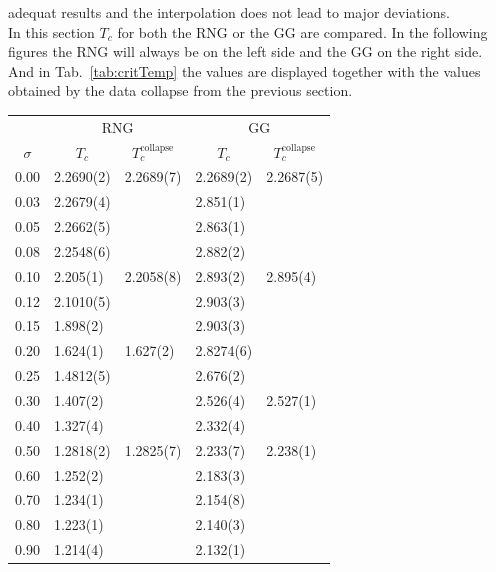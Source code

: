     adequat results and the interpolation does not lead to major
    deviations.\\
    In this section \(T_c\) for both the RNG or the GG are
    compared. In the following figures the RNG will always be on the
    left side and the GG on the right side.
    And in Tab.\ \ref{tab:critTemp} the values are displayed together with the
    values obtained by the data collapse from the previous section.
    \begin{table}[htb]
        \center
        \begin{tabular}{l l l l l}
            \toprule
             & \multicolumn{2}{c}{RNG} & \multicolumn{2}{c}{GG}\\
            \cmidrule(rl){2-3} \cmidrule(rl){4-5}
            \multicolumn{1}{c}{\(\sigma\)} & \multicolumn{1}{c}{\(T_c\)} & \multicolumn{1}{c}{\(T_c^{\mathrm{collapse}}\)} & \multicolumn{1}{c}{\(T_c\)} & \multicolumn{1}{c}{\(T_c^{\mathrm{collapse}}\)}\\
            \midrule
            0.00 & 2.2690(2)& 2.2689(7)& 2.2689(2)& 2.2687(5)\\
            0.03 & 2.2679(4)&          & 2.851(1) &         \\
            0.05 & 2.2662(5)&          & 2.863(1) &         \\
            0.08 & 2.2548(6)&          & 2.882(2) &         \\
            0.10 & 2.205(1) & 2.2058(8)& 2.893(2) & 2.895(4)\\
            0.12 & 2.1010(5)&          & 2.903(3) &         \\
            0.15 & 1.898(2) &          & 2.903(3) &         \\
            0.20 & 1.624(1) & 1.627(2) & 2.8274(6)&         \\
            0.25 & 1.4812(5)&          & 2.676(2) &         \\
            0.30 & 1.407(2) &          & 2.526(4) & 2.527(1)\\
            0.40 & 1.327(4) &          & 2.332(4) &         \\
            0.50 & 1.2818(2)& 1.2825(7)& 2.233(7) & 2.238(1)\\
            0.60 & 1.252(2) &          & 2.183(3) &         \\
            0.70 & 1.234(1) &          & 2.154(8) &         \\
            0.80 & 1.223(1) &          & 2.140(3) &         \\
            0.90 & 1.214(4) &          & 2.132(1) &         \\

\end{tabular}
\end{table}
